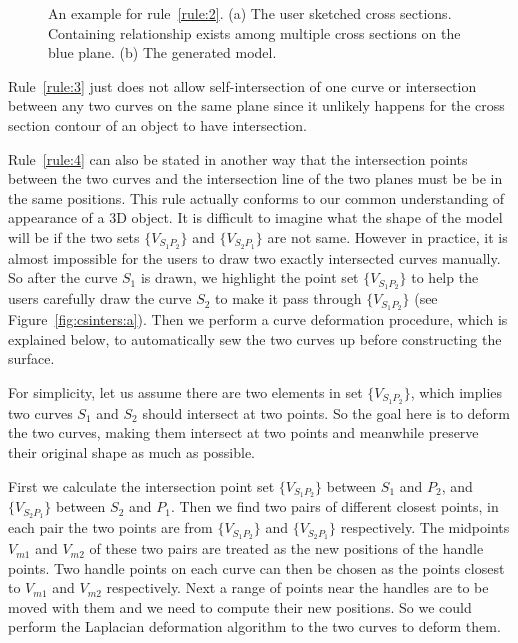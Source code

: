 \begin{figure} [htbp]
{\begin{minipage}[b]{0.22\textwidth}
    \end{minipage}}
  \caption{An example for rule~\ref{rule:2}.
  (a) The user sketched cross sections. Containing relationship exists among multiple cross sections on the blue plane.
  (b) The generated model.}
  \label{fig:rule2} %
\end{figure}

Rule~\ref{rule:3} just does not allow self-intersection of one
curve or intersection between any two curves on the same plane since
it unlikely happens for the cross section contour of an object to
have intersection.

Rule~\ref{rule:4} can also be stated in another way that the
intersection points between the two curves and the intersection line
of the two planes must be be in the same positions. This rule
actually conforms to our common understanding of appearance of a 3D
object. It is difficult to imagine what the shape of the model will
be if the two sets $\{V_{S_1P_2}\}$ and $\{V_{S_2P_1}\}$ are not
same. However in practice, it is almost impossible for the users to
draw two exactly intersected curves manually. So after the curve
$S_1$ is drawn, we highlight the point set $\{V_{S_1P_2}\}$ to help
the users carefully draw the curve $S_2$ to make it pass through
$\{V_{S_1P_2}\}$ (see Figure~\ref{fig:csinters:a}). Then we perform
a curve deformation procedure, which is explained below, to
automatically sew the two curves up before constructing the surface.

For simplicity, let us assume there are two elements  in set
$\{V_{S_1P_2}\}$, which implies two curves $S_1$ and $S_2$ should
intersect at two points. So the goal here is to deform the two
curves, making them intersect at two points and meanwhile preserve
their original shape as much as possible.

First we calculate the intersection point set  $\{V_{S_1P_2}\}$
between $S_1$ and $P_2$, and $\{V_{S_2P_1}\}$ between $S_2$ and
$P_1$. Then we find two pairs of different closest points, in each
pair the two points are from $\{V_{S_1P_2}\}$ and $\{V_{S_2P_1}\}$
respectively. The midpoints $V_{m1}$ and $V_{m2}$ of these two pairs
are treated as the new positions of the handle points. Two handle
points on each curve can then be chosen as the points closest to
$V_{m1}$ and $V_{m2}$ respectively. Next a range of points near the
handles are to be moved with them and we need to compute their new
positions. So we could perform the Laplacian deformation algorithm
to the two curves to deform them.

